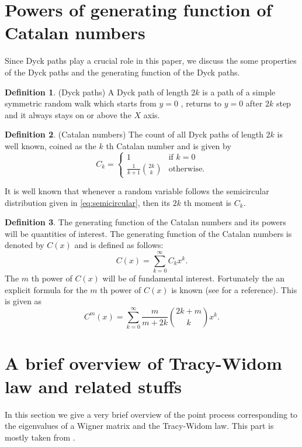 \documentclass[12pt]{article}
\numberwithin{equation}{section}
\numberwithin{equation}{section}
\theoremstyle{definition}
\newtheorem{definition}{Definition}[section]
\renewcommand{\1}{\bf 1}
\begin{document}
 \section{Powers of generating function of Catalan numbers}
 Since Dyck paths play a crucial role in this paper, we discuss the some properties of the Dyck paths and the generating function of the Dyck paths.
 \begin{definition}(Dyck paths)
 A Dyck path of length $2k$ is a path of a simple symmetric random walk which starts from $y=0$ , returns to $y=0$ after $2k$ step and it always stays on or above the $X$ axis.
 \end{definition}
 \begin{definition}(Catalan numbers)
 The count of all Dyck paths of length $2k$ is well known, coined as the $k$ th Catalan number and is given by 
 \begin{equation}\label{def:catalan}
 C_{k}=\left\{
 \begin{array}{ll}
 1 & \text{if $k=0$}\\
 \frac{1}{k+1}\binom{2k}{k} & \text{otherwise.}
 \end{array}
 \right.
 \end{equation}
 \end{definition}
 It is well known that whenever a random variable follows the semicircular distribution given in \eqref{eq:semicircular}, then its $2k$ th moment is $C_{k}$. 
 \begin{definition}
 The generating function of the Catalan numbers and its powers will be  quantities of interest. The generating function of the Catalan numbers is denoted by $C(x)$ and is defined as follows: 
 \begin{equation}\label{def:catgen}
 C(x)= \sum_{k=0}^{\infty} C_{k} x^{k}.
 \end{equation}
 The $m$ th power of $C(x)$ will be of fundamental interest. Fortunately the an explicit formula for the $m$ th power of $C(x)$ is known (see \citet{lang} for a reference). This is given as 
 \begin{equation}\label{def:mthcatalan}
 C^{m}(x)= \sum_{k=0}^{\infty} \frac{m}{m+2k}\binom{2k+m}{k} x^{k}.
 \end{equation}
 \end{definition}
 
\section{A brief overview of Tracy-Widom law and related stuffs}\label{sec:tw}
In this section we give a very brief overview of the point process corresponding to the eigenvalues of a Wigner matrix and the Tracy-Widom law. This part is mostly taken from \citet{sosh}. 
\end{document}
